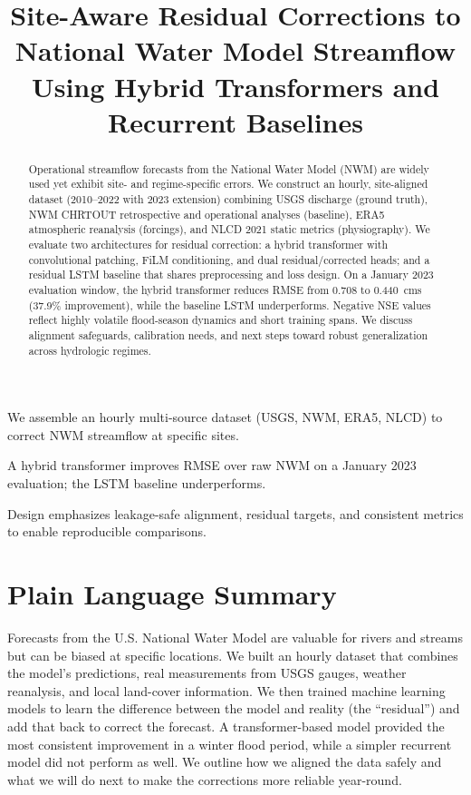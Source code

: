 \documentclass[draft]{agujournal2019}
\begin{document}
\title{Site-Aware Residual Corrections to National Water Model Streamflow Using Hybrid Transformers and Recurrent Baselines}




\begin{keypoints}
\item We assemble an hourly multi-source dataset (USGS, NWM, ERA5, NLCD) to correct NWM streamflow at specific sites.
\item A hybrid transformer improves RMSE over raw NWM on a January 2023 evaluation; the LSTM baseline underperforms.
\item Design emphasizes leakage-safe alignment, residual targets, and consistent metrics to enable reproducible comparisons.
\end{keypoints}

\begin{abstract}
Operational streamflow forecasts from the National Water Model (NWM) are widely used yet exhibit site- and regime-specific errors. We construct an hourly, site-aligned dataset (2010--2022 with 2023 extension) combining USGS discharge (ground truth), NWM CHRTOUT retrospective and operational analyses (baseline), ERA5 atmospheric reanalysis (forcings), and NLCD 2021 static metrics (physiography). We evaluate two architectures for residual correction: a hybrid transformer with convolutional patching, FiLM conditioning, and dual residual/corrected heads; and a residual LSTM baseline that shares preprocessing and loss design. On a January 2023 evaluation window, the hybrid transformer reduces RMSE from 0.708 to 0.440~cms (37.9\% improvement), while the baseline LSTM underperforms. Negative NSE values reflect highly volatile flood-season dynamics and short training spans. We discuss alignment safeguards, calibration needs, and next steps toward robust generalization across hydrologic regimes.
\end{abstract}


\section*{Plain Language Summary}
Forecasts from the U.S. National Water Model are valuable for rivers and streams but can be biased at specific locations. We built an hourly dataset that combines the model’s predictions, real measurements from USGS gauges, weather reanalysis, and local land-cover information. We then trained machine learning models to learn the difference between the model and reality (the “residual”) and add that back to correct the forecast. A transformer-based model provided the most consistent improvement in a winter flood period, while a simpler recurrent model did not perform as well. We outline how we aligned the data safely and what we will do next to make the corrections more reliable year-round.
\end{document}
